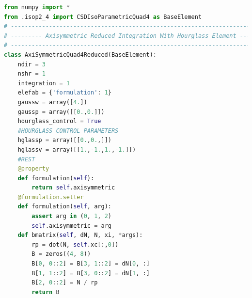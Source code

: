 \documentclass[10pt,letterpaper]{report}
\numberwithin{equation}{chapter}
\begin{document}
\begin{lstlisting}[language=Python]
from numpy import *
from .isop2_4 import CSDIsoParametricQuad4 as BaseElement
# --------------------------------------------------------------------------- #
# --------- Axisymmetric Reduced Integration With Hourglass Element --------- #
# --------------------------------------------------------------------------- #
class AxiSymmetricQuad4Reduced(BaseElement):
    ndir = 3
    nshr = 1
    integration = 1
    elefab = {'formulation': 1}
    gaussw = array([4.])
    gaussp = array([[0.,0.]])
    hourglass_control = True
    #HOURGLASS CONTROL PARAMETERS
    hglassp = array([[0.,0.,]])
    hglassv = array([[1.,-1.,1.,-1.]])
    #REST
    @property
    def formulation(self):
        return self.axisymmetric
    @formulation.setter
    def formulation(self, arg):
        assert arg in (0, 1, 2)
        self.axisymmetric = arg
    def bmatrix(self, dN, N, xi, *args):
        rp = dot(N, self.xc[:,0])
        B = zeros((4, 8))
        B[0, 0::2] = B[3, 1::2] = dN[0, :]
        B[1, 1::2] = B[3, 0::2] = dN[1, :]
        B[2, 0::2] = N / rp
        return B
\end{lstlisting}
\end{document}

